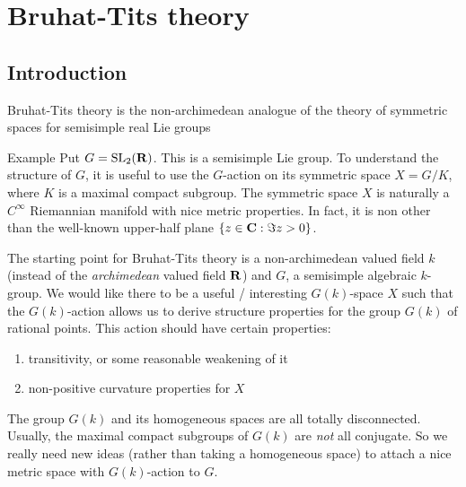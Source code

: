 
%
%
%
%


\section{Bruhat-Tits theory}




\subsection{Introduction}

Bruhat-Tits theory is the non-archimedean analogue of the theory of symmetric 
spaces for semisimple real Lie groups 

\begin{enonce}{Example}
Put $G=\operatorname{SL}_2(\mathbf{R})$. This is a semisimple Lie group. To understand the 
structure of $G$, it is useful to use the $G$-action on its symmetric space 
$X=G/K$, where $K$ is a maximal compact subgroup. The symmetric space $X$ is 
naturally a $C^\infty$ Riemannian manifold with nice metric properties. In 
fact, it is non other than the well-known upper-half plane 
$\{z\in \mathbf{C}:\Im z>0\}$. 
\end{enonce}

The starting point for Bruhat-Tits theory is a non-archimedean valued field $k$ 
(instead of the \emph{archimedean} valued field $\mathbf{R}$) and $G$, a semisimple 
algebraic $k$-group. We would like there to be a useful / interesting 
$G(k)$-space $X$ such that the $G(k)$-action allows us to derive structure 
properties for the group $G(k)$ of rational points. This action should have 
certain properties:
\begin{enumerate}
  \item transitivity, or some reasonable weakening of it 
  \item non-positive curvature properties for $X$
\end{enumerate}

The group $G(k)$ and its homogeneous spaces are all totally disconnected. 
Usually, the maximal compact subgroups of $G(k)$ are \emph{not} all conjugate. 
So we really need new ideas (rather than taking a homogeneous space) to attach 
a nice metric space with $G(k)$-action to $G$. 






